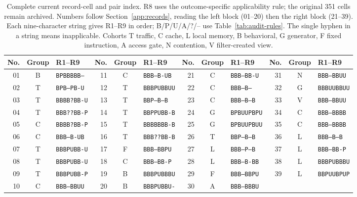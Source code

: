 \begin{table}[t]\centering\footnotesize
\caption{Complete current record-cell and pair index. R8 uses the outcome-specific applicability rule; the original 351 cells remain archived. Numbers follow Section~\ref{app:records}, reading the left block (01--20) then the right block (21--39). Each nine-character string gives R1--R9 in order; B/P/U/A/?/-- use Table~\ref{tab:audit-rules}. The single hyphen in a string means inapplicable. Cohorts T traffic, C cache, L local memory, B behavioral, G generator, F fixed instruction, A access gate, N contention, V filter-created view.}\label{tab:r37-reconstruction}
\begin{tabular}{@{}rcl@{\hspace{12pt}}rcl@{\hspace{12pt}}rcl@{\hspace{12pt}}rcl@{}}\toprule
No. & Group & R1--R9 & No. & Group & R1--R9 & No. & Group & R1--R9 & No. & Group & R1--R9\\\midrule
01 & B & \texttt{BPBBBBB--} & 11 & C & \texttt{BBB--B-UB} & 21 & C & \texttt{BBB--BB-U} & 31 & N & \texttt{BBB--BBUU}\\
02 & T & \texttt{BPB--PB-U} & 12 & T & \texttt{BBBPUBBUU} & 22 & C & \texttt{BBB--B---} & 32 & G & \texttt{BBBUUBBUU}\\
03 & T & \texttt{BBBB?BB-U} & 13 & T & \texttt{BBP--B--B} & 23 & C & \texttt{BBB--B--B} & 33 & V & \texttt{BBB--BBUU}\\
04 & T & \texttt{BBB??BB-P} & 14 & T & \texttt{BBPPUBB-B} & 24 & G & \texttt{BPBUUPBPU} & 34 & C & \texttt{BBB--BBBB}\\
05 & C & \texttt{BBBB?BB-P} & 15 & T & \texttt{BBBBBBB-B} & 25 & G & \texttt{BPBUUPBUU} & 35 & C & \texttt{BBB--BBBB}\\
06 & C & \texttt{BBB--B-UB} & 16 & T & \texttt{BBB??BB-B} & 26 & T & \texttt{BBP--B--B} & 36 & L & \texttt{BBB--B--B}\\
07 & T & \texttt{BBBPUBB-U} & 17 & F & \texttt{BBB--BBPU} & 27 & L & \texttt{BBB--P--B} & 37 & L & \texttt{BBB--BB-P}\\
08 & T & \texttt{BBBPUBB-U} & 18 & C & \texttt{BBB--BB-P} & 28 & L & \texttt{BBB--B-BB} & 38 & L & \texttt{BBBPUBBBU}\\
09 & T & \texttt{BBBPUBB-P} & 19 & B & \texttt{BBBPUBBBU} & 29 & F & \texttt{BBB--BBPU} & 39 & L & \texttt{BBPUUBPUP}\\
10 & C & \texttt{BBB--BBUU} & 20 & B & \texttt{BBBPUBBU-} & 30 & A & \texttt{BBB--BBBU} &  & & \\

\end{tabular}
\end{table}

